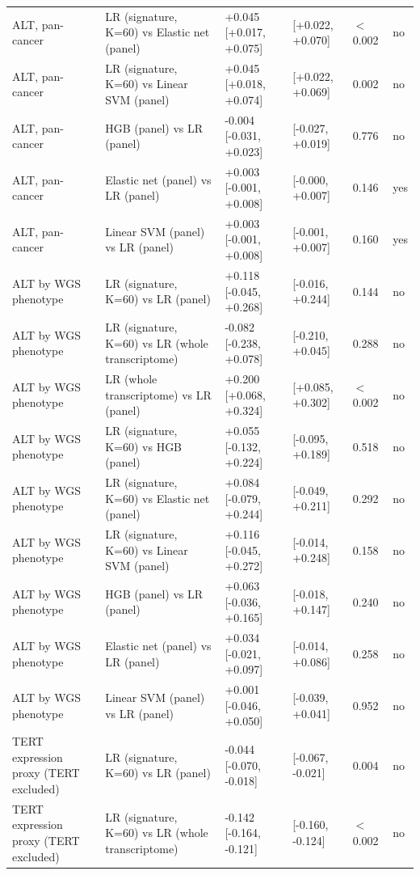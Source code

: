 \begin{longtable}{@{}>{\raggedright\arraybackslash}p{}>{\raggedright\arraybackslash}p{}p{}p{}p{}p{}@{}}
ALT, pan-cancer & LR (signature, K=60) vs Elastic net (panel) & +0.045 [+0.017, +0.075] & [+0.022, +0.070] & $<$0.002 & no \\
ALT, pan-cancer & LR (signature, K=60) vs Linear SVM (panel) & +0.045 [+0.018, +0.074] & [+0.022, +0.069] & 0.002 & no \\
ALT, pan-cancer & HGB (panel) vs LR (panel) & -0.004 [-0.031, +0.023] & [-0.027, +0.019] & 0.776 & no \\
ALT, pan-cancer & Elastic net (panel) vs LR (panel) & +0.003 [-0.001, +0.008] & [-0.000, +0.007] & 0.146 & yes \\
ALT, pan-cancer & Linear SVM (panel) vs LR (panel) & +0.003 [-0.001, +0.008] & [-0.001, +0.007] & 0.160 & yes \\
ALT by WGS phenotype & LR (signature, K=60) vs LR (panel) & +0.118 [-0.045, +0.268] & [-0.016, +0.244] & 0.144 & no \\
ALT by WGS phenotype & LR (signature, K=60) vs LR (whole transcriptome) & -0.082 [-0.238, +0.078] & [-0.210, +0.045] & 0.288 & no \\
ALT by WGS phenotype & LR (whole transcriptome) vs LR (panel) & +0.200 [+0.068, +0.324] & [+0.085, +0.302] & $<$0.002 & no \\
ALT by WGS phenotype & LR (signature, K=60) vs HGB (panel) & +0.055 [-0.132, +0.224] & [-0.095, +0.189] & 0.518 & no \\
ALT by WGS phenotype & LR (signature, K=60) vs Elastic net (panel) & +0.084 [-0.079, +0.244] & [-0.049, +0.211] & 0.292 & no \\
ALT by WGS phenotype & LR (signature, K=60) vs Linear SVM (panel) & +0.116 [-0.045, +0.272] & [-0.014, +0.248] & 0.158 & no \\
ALT by WGS phenotype & HGB (panel) vs LR (panel) & +0.063 [-0.036, +0.165] & [-0.018, +0.147] & 0.240 & no \\
ALT by WGS phenotype & Elastic net (panel) vs LR (panel) & +0.034 [-0.021, +0.097] & [-0.014, +0.086] & 0.258 & no \\
ALT by WGS phenotype & Linear SVM (panel) vs LR (panel) & +0.001 [-0.046, +0.050] & [-0.039, +0.041] & 0.952 & no \\
TERT expression proxy (TERT excluded) & LR (signature, K=60) vs LR (panel) & -0.044 [-0.070, -0.018] & [-0.067, -0.021] & 0.004 & no \\
TERT expression proxy (TERT excluded) & LR (signature, K=60) vs LR (whole transcriptome) & -0.142 [-0.164, -0.121] & [-0.160, -0.124] & $<$0.002 & no \\

\end{longtable}
